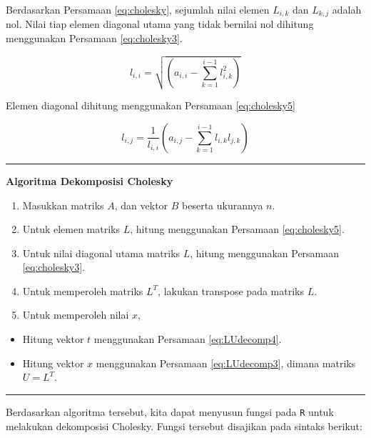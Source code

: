 \documentclass[
]{book}
\providecommand{\tightlist}{%
  \setlength{\itemsep}{0pt}\setlength{\parskip}{0pt}}
\theoremstyle{definition}
\theoremstyle{definition}
\theoremstyle{definition}
\theoremstyle{definition}
\theoremstyle{remark}
\begin{document}
Berdasarkan Persamaan \eqref{eq:cholesky}, sejumlah nilai elemen \(L_{i,k}\) dan \(L_{k,j}\) adalah nol. Nilai tiap elemen diagonal utama yang tidak bernilai nol dihitung menggunakan Persamaan \eqref{eq:cholesky3}.

\begin{equation}
l_{i,i}=\sqrt{\left(a_{i,i}-\sum_{k=1}^{i-1}l_{i,k}^2\right)}
  \label{eq:cholesky3}
\end{equation}

Elemen diagonal dihitung menggunakan Persamaan \eqref{eq:cholesky5}

\begin{equation}
l_{i,j}=\frac{1}{l_{i,i}}\left(a_{i,j}-\sum_{k=1}^{i-1}l_{i,k}l_{j,k}\right)
  \label{eq:cholesky5}
\end{equation}

\begin{center}\rule{0.5\linewidth}{0.5pt}\end{center}

\textbf{Algoritma Dekomposisi Cholesky}

\begin{enumerate}
\def\labelenumi{\arabic{enumi}.}
\tightlist
\item
  Masukkan matriks \(A\), dan vektor \(B\) beserta ukurannya \(n\).
\item
  Untuk elemen matriks \(L\), hitung menggunakan Persamaan \eqref{eq:cholesky5}.
\item
  Untuk nilai diagonal utama matriks \(L\), hitung menggunakan Persamaan \eqref{eq:cholesky3}.
\item
  Untuk memperoleh matriks \(L^T\), lakukan transpose pada matriks \(L\).
\item
  Untuk memperoleh nilai \(x\),
\end{enumerate}

\begin{itemize}
\tightlist
\item
  Hitung vektor \(t\) menggunakan Persamaan \eqref{eq:LUdecomp4}.
\item
  Hitung vektor \(x\) menggunakan Persamaan \eqref{eq:LUdecomp3}, dimana matriks \(U=L^T\).
\end{itemize}

\begin{center}\rule{0.5\linewidth}{0.5pt}\end{center}

Berdasarkan algoritma tersebut, kita dapat menyusun fungsi pada \texttt{R} untuk melakukan dekomposisi Cholesky. Fungsi tersebut disajikan pada sintaks berikut:
\end{document}
